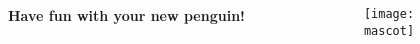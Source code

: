 \DarkBG
\begin{frame}[plain]%
	\begin{columns}
		\hfill
		\begin{column}{.4\linewidth}
			\Huge\color{background-local}\textbf{Have fun with your new penguin!}
		\end{column}
		\hfill
		\begin{column}{.55\linewidth}
			\texttt{[image: \\mascot]}%
		\end{column}
		\hfill
	\end{columns}
\end{frame}%
\ResetBG%
